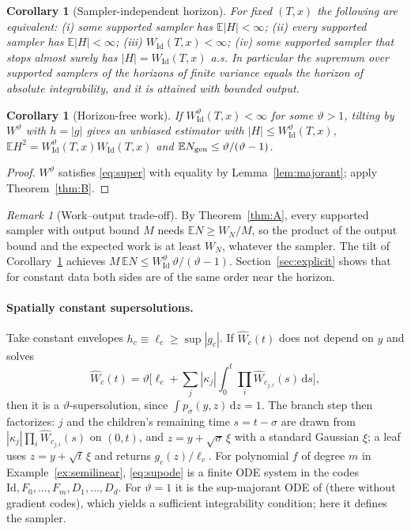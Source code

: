 \documentclass[11pt]{article}
\newtheorem{corollary}[theorem]{Corollary}
\theoremstyle{definition}
\theoremstyle{remark}
\newtheorem{remark}[theorem]{Remark}
\newcommand{\E}{\mathbb{E}}
\newcommand{\Id}{\mathrm{Id}}
\newcommand{\dd}{\,\mathrm{d}}
\newcommand{\Wh}{\widehat W}
\begin{document}
\begin{corollary}[Sampler-independent horizon]\label{cor:B1}
For fixed $(T,x)$ the following are equivalent: (i) some supported sampler
has $\E|H|<\infty$; (ii) every supported sampler has $\E|H|<\infty$;
(iii) $W_\Id(T,x)<\infty$; (iv) some supported sampler that stops almost
surely has $|H|=W_\Id(T,x)$ a.s. In particular the supremum over supported
samplers of the horizons of finite variance equals the horizon of
absolute integrability, and it is attained with bounded output.
\end{corollary}

\begin{corollary}[Horizon-free work]\label{cor:B2}
If $W^\vartheta_\Id(T,x)<\infty$ for some $\vartheta>1$, tilting by
$W^\vartheta$ with $h=|g|$ gives an unbiased estimator with
$|H|\le W^\vartheta_\Id(T,x)$, $\E H^2=W^\vartheta_\Id(T,x)W_\Id(T,x)$ and
$\E N_{\rm gen}\le\vartheta/(\vartheta-1)$.
\end{corollary}
\begin{proof}
$W^\vartheta$ satisfies \eqref{eq:super} with equality by
Lemma~\ref{lem:majorant}; apply Theorem~\ref{thm:B}.
\end{proof}

\begin{remark}[Work--output trade-off]\label{rem:tradeoff}
By Theorem~\ref{thm:A}, every supported sampler with output bound $M$
needs $\E N\ge W_N/M$, so the product of the output bound and the
expected work is at least $W_N$, whatever the sampler. The tilt of
Corollary~\ref{cor:B2} achieves $M\,\E N\le W^\vartheta_\Id\,
\vartheta/(\vartheta-1)$. Section~\ref{sec:explicit} shows that for
constant data both sides are of the same order near the horizon.
\end{remark}

\paragraph{Spatially constant supersolutions.} Take constant envelopes
$h_c\equiv\ell_c\ge\sup|g_c|$. If $\Wh_c(t)$ does not depend on $y$ and
solves
\begin{equation}\label{eq:supode}
\Wh_c(t)=\vartheta\Big[\ell_c+\sum_j|\kappa_j|\int_0^t\prod_i\Wh_{c_{j,i}}(s)\dd s\Big],
\end{equation}
then it is a $\vartheta$-supersolution, since $\int p_\sigma(y,z)\dd z=1$.
The branch step then factorizes: $j$ and the children's remaining time
$s=t-\sigma$ are drawn from $|\kappa_j|\prod_i\Wh_{c_{j,i}}(s)$ on
$(0,t)$, and $z=y+\sqrt\sigma\,\xi$ with a standard Gaussian $\xi$; a leaf
uses $z=y+\sqrt t\,\xi$ and returns $g_c(z)/\ell_c$. For polynomial $f$ of
degree $m$ in Example~\ref{ex:semilinear}, \eqref{eq:supode} is a finite
ODE system in the codes $\Id,F_0,\dots,F_m,D_1,\dots,D_d$. For $\vartheta=1$
it is the sup-majorant ODE of \cite[(3.10)]{HLT21} (there without gradient
codes), which yields a sufficient integrability condition; here it defines
the sampler.
\end{document}
